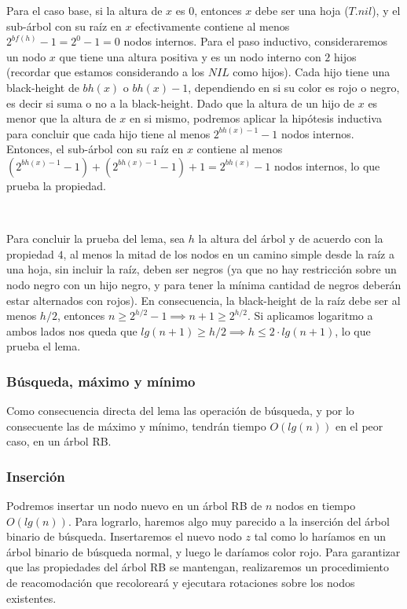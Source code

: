 \documentclass[10pt, a4paper]{report}
\begin{document}
Para el caso base, si la altura de $x$ es $0$, entonces $x$ debe ser una hoja ($T.nil$), y el sub-\'arbol con su ra\'iz en $x$ efectivamente contiene al menos $2^{bf(h)}-1 = 2^0 -1 = 0$ nodos internos. Para el paso inductivo, consideraremos un nodo $x$ que tiene una altura positiva y es un nodo interno con $2$ hijos (recordar que estamos considerando a los $NIL$ como hijos). Cada hijo tiene una black-height de $bh(x)$ o $bh(x)-1$, dependiendo en si su color es rojo o negro, es decir si suma o no a la black-height. Dado que la altura de un hijo de $x$ es menor que la altura de $x$ en si mismo, podremos aplicar la hip\'otesis inductiva para concluir que cada hijo tiene al menos $2^{bh(x)-1}-1$ nodos internos. Entonces, el sub-\'arbol con su ra\'iz en $x$ contiene al menos $(2^{bh(x)-1}-1) + (2^{bh(x)-1}-1) + 1 = 2^{bh(x)}-1$ nodos internos, lo que prueba la propiedad.

~

Para concluir la prueba del lema, sea $h$ la altura del \'arbol y de acuerdo con la propiedad $4$, al menos la mitad de los nodos en un camino simple desde la ra\'iz a una hoja, sin incluir la ra\'iz, deben ser negros (ya que no hay restricci\'on sobre un nodo negro con un hijo negro, y para tener la m\'inima cantidad de negros deber\'an estar alternados con rojos). En consecuencia, la black-height de la ra\'iz debe ser al menos $h/2$, entonces $n \geq 2^{h/2}-1 \implies n+1 \geq 2^{h/2}$. Si aplicamos logaritmo a ambos lados nos queda que $lg(n+1) \geq h/2 \implies h \leq 2 \cdot lg(n+1)$, lo que prueba el lema.

\subsubsection{B\'usqueda, m\'aximo y m\'inimo}

Como consecuencia directa del lema las operaci\'on de b\'usqueda, y por lo consecuente las de m\'aximo y m\'inimo, tendr\'an tiempo $O(lg(n))$ en el peor caso, en un \'arbol RB.

\subsubsection{Inserci\'on}

Podremos insertar un nodo nuevo en un \'arbol RB de $n$ nodos en tiempo $O(lg(n))$. Para lograrlo, haremos algo muy parecido a la inserci\'on del \'arbol binario de b\'usqueda. Insertaremos el nuevo nodo $z$ tal como lo har\'iamos en un \'arbol binario de b\'usqueda normal, y luego le dar\'iamos color rojo. Para garantizar que las propiedades del \'arbol RB se mantengan, realizaremos un procedimiento de reacomodaci\'on que recolorear\'a y ejecutara rotaciones sobre los nodos existentes.
\end{document}
